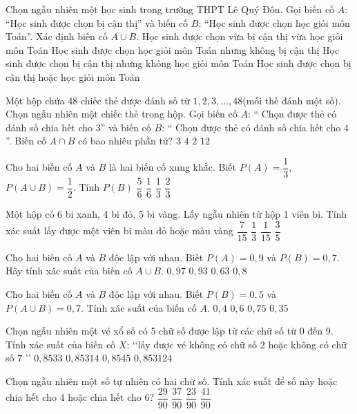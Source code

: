 \begin{ex}
Chọn ngẫu nhiên một học sinh trong trường THPT Lê Quý Đôn. Gọi biến cố $A$: “Học sinh được chọn bị cận thị” và biến cố $B$: “Học sinh được chọn học giỏi môn Toán”. Xác định biến cố $A\cup B$.
\choice
{Học sinh được chọn vừa bị cận thị vừa học giỏi môn Toán}
{Học sinh được chọn học giỏi môn Toán nhưng không bị cận thị}
{Học sinh được chọn bị cận thị nhưng không học giỏi môn Toán}
{Học sinh được chọn bị cận thị hoặc học giỏi môn Toán}
\end{ex}
\begin{ex}
Một hộp chứa $48$ chiếc thẻ được đánh số từ $1{,}2,3,\ldots,48$(mỗi thẻ đánh một số). Chọn ngẫu nhiên một chiếc thẻ trong hộp. Gọi biến cố $A$: “ Chọn được thẻ có đánh số chia hết cho $3$” và biến cố $B$: “ Chọn được thẻ có đánh số chia hết cho $4$”. Biến cố $A\cap B$ có bao nhiêu phần tử?
\choice
{$3$}
{$4$}
{$2$}
{$12$}
\end{ex}
\begin{ex}
Cho hai biến cố $A$ và $B$ là hai biến cố xung khắc. Biết $P(A)=\dfrac{1}{3}$, $P\left(A\cup B\right)=\dfrac{1}{2}$. Tính $P(B)$
\choice
{$\dfrac{5}{6}$}
{$\dfrac{1}{6}$}
{$\dfrac{1}{3}$}
{$\dfrac{2}{3}$}
\end{ex}
\begin{ex}
Một hộp có 6 bi xanh, 4 bi đỏ, 5 bi vàng. Lấy ngẫu nhiên từ hộp 1 viên bi. Tính xác suất lấy được một viên bi màu đỏ hoặc màu vàng
\choice
{$\dfrac{7}{15}$}
{$\dfrac{1}{3}$}
{$\dfrac{1}{15}$}
{$\dfrac{3}{5}$}
\end{ex}
\begin{ex}
Cho hai biến cố $A$ và $B$ độc lập với nhau. Biết $P(A)=0{,}9$ và $P(B)=0{,}7$. Hãy tính xác suất của biến cố $A \cup B$.
\choice
{$0{,}97$}
{$0{,}93$}
{$0{,}63$}
{$0{,}8$}
\end{ex}
\begin{ex}
Cho hai biến cố $A$ và $B$ độc lập với nhau. Biết $P(B)=0{,}5$ và $P(A \cup B)=0{,}7$. Tính xác suất của biến cố $A$.
\choice
{$0{,}4$}
{$0{,}6$}
{$0{,}75$}
{$0{,}35$}
\end{ex}
\begin{ex}
Chọn ngẫu nhiên một vé xổ số có 5 chữ số được lập từ các chữ số từ 0 đến 9. Tính xác suất của biến cố $X$: \lq\lq lấy được vé không có chữ số 2 hoặc không có chữ số $7$ \rq\rq
\choice
{$0{,}8533$}
{$0{,}85314$}
{$0{,}8545$}
{$0{,}853124$}
\end{ex}
\begin{ex}
Chọn ngẫu nhiên một số tự nhiên có hai chữ số. Tính xác suất để số này hoặc chia hết cho 4 hoặc chia hết cho 6?
\choice
{$\dfrac{29}{90}$}
{$\dfrac{37}{90}$}
{$\dfrac{23}{90}$}
{$\dfrac{41}{90}$}
\end{ex}
